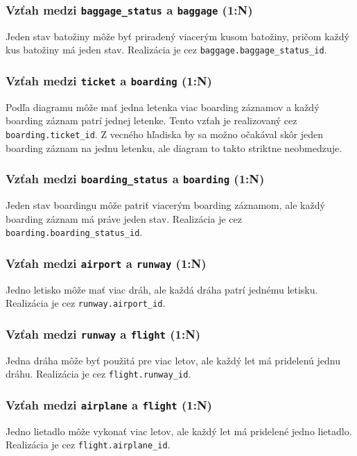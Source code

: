 \documentclass[11pt, a4paper]{article}
\begin{document}
\subsubsection*{Vzťah medzi \texttt{baggage\_status} a \texttt{baggage} (1:N)}
Jeden stav batožiny môže byť priradený viacerým kusom batožiny, pričom každý
kus batožiny má jeden stav. Realizácia je cez
\texttt{baggage.baggage\_status\_id}.

\subsubsection*{Vzťah medzi \texttt{ticket} a \texttt{boarding} (1:N)}
Podľa diagramu môže mať jedna letenka viac boarding záznamov a každý boarding
záznam patrí jednej letenke. Tento vzťah je realizovaný cez
\texttt{boarding.ticket\_id}. Z vecného hľadiska by sa možno očakával skôr
jeden boarding záznam na jednu letenku, ale diagram to takto striktne
neobmedzuje.

\subsubsection*{Vzťah medzi \texttt{boarding\_status} a \texttt{boarding} (1:N)}
Jeden stav boardingu môže patriť viacerým boarding záznamom, ale každý boarding
záznam má práve jeden stav. Realizácia je cez
\texttt{boarding.boarding\_status\_id}.

\subsubsection*{Vzťah medzi \texttt{airport} a \texttt{runway} (1:N)}
Jedno letisko môže mať viac dráh, ale každá dráha patrí jednému letisku.
Realizácia je cez \texttt{runway.airport\_id}.

\subsubsection*{Vzťah medzi \texttt{runway} a \texttt{flight} (1:N)}
Jedna dráha môže byť použitá pre viac letov, ale každý let má pridelenú jednu
dráhu. Realizácia je cez \texttt{flight.runway\_id}.

\subsubsection*{Vzťah medzi \texttt{airplane} a \texttt{flight} (1:N)}
Jedno lietadlo môže vykonať viac letov, ale každý let má pridelené jedno
lietadlo. Realizácia je cez \texttt{flight.airplane\_id}.
\end{document}
